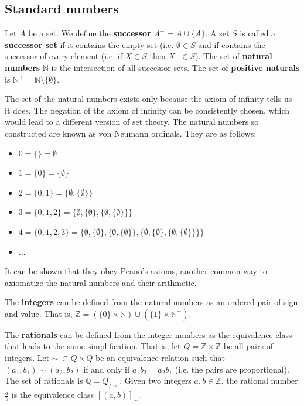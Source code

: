 \documentclass{article}
\begin{document}
\subsection{Standard numbers}

\begin{defn}\label{defn_successor_set}
	Let $A$ be a set. We define the \textbf{successor} $A^+ = A \cup \{A\}$. A set $S$ is called a \textbf{successor set} if it contains the empty set (i.e. $\emptyset \in S$ and if contains the successor of every element (i.e. if $X \in S$ then $X^+ \in S$). The set of \textbf{natural numbers} $\mathbb{N}$ is the intersection of all successor sets. The set of \textbf{positive naturals} is $\mathbb{N}^+ = \mathbb{N} \setminus \{ \emptyset \}$.
\end{defn}
\begin{remark}
	The set of the natural numbers exists only because the axiom of infinity tells us it does. The negation of the axiom of infinity can be consistently chosen, which would lead to a different version of set theory. The natural numbers so constructed are known as von Neumann ordinals. They are as follows:
	\begin{itemize}
		\item $0 = \{ \} = \emptyset$
		\item $1 = \{ 0 \} = \{ \emptyset \}$
		\item $2 = \{0, 1\} = \{ \emptyset, \{ \emptyset\} \}$
		\item $3 = \{0, 1, 2\} = \{ \emptyset, \{ \emptyset\}, \{ \emptyset, \{ \emptyset\} \} \}$
		\item $4 = \{0, 1, 2, 3\} = \{ \emptyset, \{ \emptyset\}, \{ \emptyset, \{ \emptyset\} \}, \{ \emptyset, \{ \emptyset\}, \{ \emptyset, \{ \emptyset\} \} \} \}$
		\item ...
	\end{itemize}
	It can be shown that they obey Peano's axioms, another common way to axiomatize the natural numbers and their arithmetic.
\end{remark}

\begin{defn}
	The \textbf{integers} can be defined from the natural numbers as an ordered pair of sign and value. That is, $\mathbb{Z} = (\{ 0 \} \times \mathbb{N}) \cup (\{ 1 \} \times \mathbb{N}^+)$.
\end{defn}

\begin{defn}
	The \textbf{rationals} can be defined from the integer numbers as the equivalence class that leads to the same simplification. That is, let $Q = \mathbb{Z} \times \mathbb{Z}$ be all pairs of integers. Let $\sim \, \subset Q \times Q$ be an equivalence relation such that $(a_1, b_1) \sim (a_2, b_2)$ if and only if $a_1 b_2 = a_2 b_1$ (i.e. the pairs are proportional). The set of rationals is $\mathbb{Q} = Q_{/\sim}$. Given two integers $a, b \in \mathbb{Z}$, the rational number $\frac{a}{b}$ is the equivalence class $[(a,b)]_{\sim}$.
\end{defn}
\end{document}
